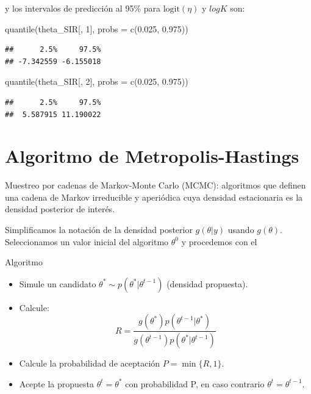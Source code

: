 \documentclass[
  12pt,
]{book}
\newenvironment{Shaded}{\begin{snugshade}}{\end{snugshade}}
\newcommand{\AttributeTok}[1]{\textcolor[rgb]{0.77,0.63,0.00}{#1}}
\newcommand{\DecValTok}[1]{\textcolor[rgb]{0.00,0.00,0.81}{#1}}
\newcommand{\FloatTok}[1]{\textcolor[rgb]{0.00,0.00,0.81}{#1}}
\newcommand{\FunctionTok}[1]{\textcolor[rgb]{0.00,0.00,0.00}{#1}}
\newcommand{\NormalTok}[1]{#1}
\providecommand{\tightlist}{%
  \setlength{\itemsep}{0pt}\setlength{\parskip}{0pt}}
\theoremstyle{definition}
\theoremstyle{definition}
\theoremstyle{definition}
\theoremstyle{definition}
\theoremstyle{remark}
\begin{document}
y los intervalos de predicción al 95\% para \(\text{logit}(\eta)\) y \(log K\) son:

\begin{Shaded}
\begin{Highlighting}[]
\FunctionTok{quantile}\NormalTok{(theta\_SIR[, }\DecValTok{1}\NormalTok{], }\AttributeTok{probs =} \FunctionTok{c}\NormalTok{(}\FloatTok{0.025}\NormalTok{, }\FloatTok{0.975}\NormalTok{))}
\end{Highlighting}
\end{Shaded}

\begin{verbatim}
##      2.5%     97.5% 
## -7.342559 -6.155018
\end{verbatim}

\begin{Shaded}
\begin{Highlighting}[]
\FunctionTok{quantile}\NormalTok{(theta\_SIR[, }\DecValTok{2}\NormalTok{], }\AttributeTok{probs =} \FunctionTok{c}\NormalTok{(}\FloatTok{0.025}\NormalTok{, }\FloatTok{0.975}\NormalTok{))}
\end{Highlighting}
\end{Shaded}

\begin{verbatim}
##      2.5%     97.5% 
##  5.587915 11.190022
\end{verbatim}

\hypertarget{algoritmo-de-metropolis-hastings}{%
\section{Algoritmo de Metropolis-Hastings}\label{algoritmo-de-metropolis-hastings}}

Muestreo por cadenas de Markov-Monte Carlo (MCMC): algoritmos que definen una cadena de Markov irreducible y aperiódica cuya densidad estacionaria es la densidad posterior de interés.

Simplificamos la notación de la densidad posterior \(g(\theta|y)\) usando \(g(\theta)\). Seleccionamos un valor inicial del algoritmo \(\theta^0\) y procedemos con el

Algoritmo

\begin{itemize}
\tightlist
\item
  Simule un candidato \(\theta^*\sim p(\theta^*|\theta^{t-1})\) (densidad propuesta).
\item
  Calcule:
  \[R=\frac{g(\theta^*)p(\theta^{t-1}|\theta^*)}{g(\theta^{t-1})p(\theta^*|\theta^{t-1})}\]
\item
  Calcule la probabilidad de aceptación \(P=\min \{R,1\}\).
\item
  Acepte la propuesta \(\theta^{t}=\theta^*\) con probabilidad P, en caso contrario \(\theta^t=\theta^{t-1}\).
\end{itemize}
\end{document}
